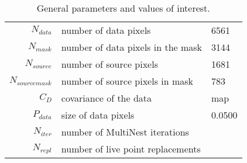 \begin{table*}[!htb]\caption{General parameters and values of interest.}\begin{center}\begin{tabular}{ r l l }\hline $N_{data}$        & number of data pixels             & 6561 \\ 
 $N_{mask}$        & number of data pixels in the mask & 3144 \\ 
 $N_{source}$      & number of source pixels           & 1681 \\ 
 $N_{source mask}$ & number of source pixels in mask   & 783 \\ 
 $C_D$        & covariance of the data            & map \\ 
 $P_{data}$   & size of data pixels               &     0.0500 \\ 
\hline  $N_{iter}$   & number of MultiNest iterations    &  \\ 
 $N_{repl}$   & number of live point replacements &  \\ 
\hline\end{tabular}\end{center}\label{tab:3}\end{table*}